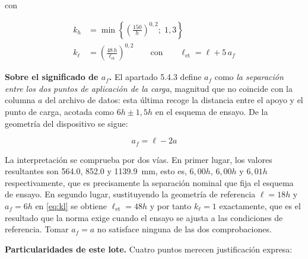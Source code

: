 \documentclass[11pt,a4paper]{article}
\newcommand{\lonet}{\ell_{\mathrm{et}}}   %
\begin{document}
\noindent con

\begin{align}
k_{h}      &= \min\left\{ \left(\frac{150}{h}\right)^{0{,}2} ;\; 1{,}3 \right\}
\tag{384-4}\label{eq:kh}\\[0.4em]
k_{\ell}   &= \left(\frac{48\,h}{\lonet}\right)^{0{,}2}
\qquad\text{con}\qquad \lonet = \ell + 5\,a_{f}
\tag{384-5 y 384-6}\label{eq:kl}
\end{align}

\medskip
\noindent\textbf{Sobre el significado de $a_{f}$.} El apartado 5.4.3 define $a_{f}$ como
\emph{la separación entre los dos puntos de aplicación de la carga}, magnitud que no
coincide con la columna $a$ del archivo de datos: esta última recoge la distancia entre
el apoyo y el punto de carga, acotada como $6h \pm 1{,}5h$ en el esquema de ensayo. De
la geometría del dispositivo se sigue:

\begin{equation}
a_{f} = \ell - 2a
\label{eq:af}
\end{equation}

\noindent La interpretación se comprueba por dos vías. En primer lugar, los valores
resultantes son \num{564,0}, \num{852,0} y \SI{1139,9}{\milli\meter}, esto es,
$6{,}00h$, $6{,}00h$ y $6{,}01h$ respectivamente, que es precisamente la separación
nominal que fija el esquema de ensayo. En segundo
lugar, sustituyendo la geometría de referencia $\ell = 18h$ y $a_{f} = 6h$ en
\eqref{eq:kl} se obtiene $\lonet = 48h$ y por tanto $k_{\ell} = 1$ exactamente, que es
el resultado que la norma exige cuando el ensayo se ajusta a las condiciones de
referencia. Tomar $a_{f} = a$ no satisface ninguna de las dos comprobaciones.

\medskip
\noindent\textbf{Particularidades de este lote.} Cuatro puntos merecen justificación
expresa:
\end{document}
